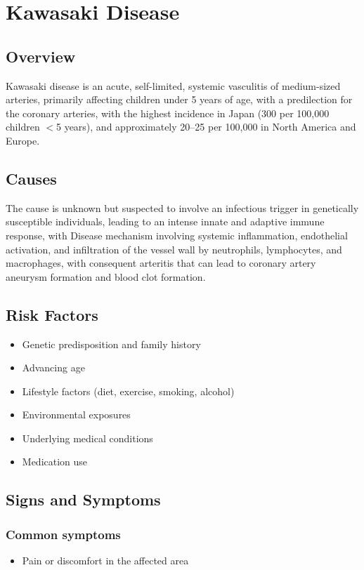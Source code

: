 \chapter{Kawasaki Disease}
\label{sec:Kawasaki Disease}

\section{Overview}
Kawasaki disease is an acute, self-limited, systemic vasculitis of medium-sized arteries, primarily affecting children under 5 years of age, with a predilection for the coronary arteries, with the highest incidence in Japan (300 per 100,000 children $<$5 years), and approximately 20--25 per 100,000 in North America and Europe.
\section{Causes}
The cause is unknown but suspected to involve an infectious trigger in genetically susceptible individuals, leading to an intense innate and adaptive immune response, with Disease mechanism involving systemic inflammation, endothelial activation, and infiltration of the vessel wall by neutrophils, lymphocytes, and macrophages, with consequent arteritis that can lead to coronary artery aneurysm formation and blood clot formation.     
\section{Risk Factors}

\begin{itemize}[noitemsep]
  \item Genetic predisposition and family history
  \item Advancing age
  \item Lifestyle factors (diet, exercise, smoking, alcohol)
  \item Environmental exposures
  \item Underlying medical conditions
  \item Medication use
\end{itemize}
\section{Signs and Symptoms}

\subsection{Common symptoms}
\begin{itemize}[noitemsep]
  \item Pain or discomfort in the affected area
  \end{itemize}


